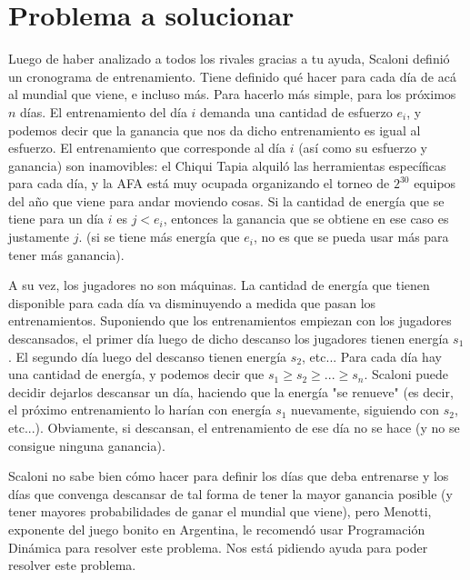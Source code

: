 \section{Problema a solucionar}
\renewcommand{\labelenumii}{\arabic{enumi}.\arabic{enumii}}
\renewcommand{\labelenumiii}{\arabic{enumi}.\arabic{enumii}.\arabic{enumiii}}
\renewcommand{\labelenumiv}{\arabic{enumi}.\arabic{enumii}.\arabic{enumiii}.\arabic{enumiv}}

Luego de haber analizado a todos los rivales gracias a tu ayuda, Scaloni definió
un cronograma de entrenamiento. Tiene definido qué hacer para cada día de acá
al mundial que viene, e incluso más. Para hacerlo más simple, para los próximos $n$
días. El entrenamiento del día $i$ demanda una 
cantidad de esfuerzo $e_i$, y podemos decir que la ganancia que nos da
dicho entrenamiento es igual al esfuerzo. El entrenamiento 
que corresponde al día $i$ (así como su esfuerzo y ganancia) son inamovibles: 
el Chiqui Tapia alquiló las herramientas específicas para cada día, y la AFA 
está muy ocupada organizando el torneo de $2^{30}$ equipos del año que viene para 
andar moviendo cosas. Si la cantidad de energía que se tiene para un día $i$
es $j < e_i$, entonces la ganancia que se obtiene en ese caso es justamente $j$.
(si se tiene más energía que $e_i$, no es que se pueda usar más para tener más ganancia).

A su vez, los jugadores no son máquinas. La cantidad de energía que tienen disponible
para cada día va disminuyendo a medida que pasan los entrenamientos. Suponiendo
que los entrenamientos empiezan con los jugadores descansados, el primer
día luego de dicho descanso los jugadores tienen energía $s_1$. El segundo día
luego del descanso tienen energía $s_2$, etc... Para cada día
hay una cantidad de energía, y podemos decir que $s_1 \geq s_2 \geq ... \geq s_n$.
Scaloni puede decidir dejarlos descansar un día, haciendo que la energía "se renueve"
(es decir, el próximo entrenamiento lo harían con energía $s_1$ nuevamente,
siguiendo con $s_2$, etc...). Obviamente, si descansan, el entrenamiento de ese
día no se hace (y no se consigue ninguna ganancia).   

Scaloni no sabe bien cómo hacer para definir los días que deba entrenarse y los días
que convenga descansar de tal forma de tener la mayor ganancia posible (y tener
mayores probabilidades de ganar el mundial que viene), pero Menotti, 
exponente del juego bonito en Argentina, le recomendó usar Programación Dinámica
para resolver este problema. Nos está pidiendo ayuda para poder resolver este
problema. 

